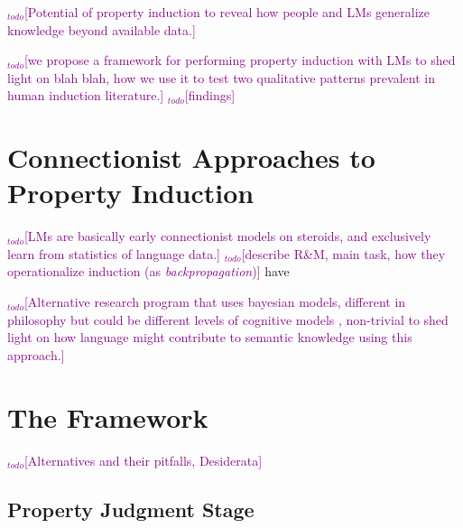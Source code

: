\documentclass[10pt,letterpaper]{article}
\newcommand{\todo}[1]{\textcolor{purple}{$_{todo}$[#1]}}
\begin{document}
\todo{Potential of property induction to reveal how people and LMs generalize knowledge beyond available data.}

\todo{we propose a framework for performing property induction with LMs to shed light on blah blah, how we use it to test two qualitative patterns prevalent in human induction literature.}
\todo{findings}



\section{Connectionist Approaches to Property Induction}
\todo{LMs are basically early connectionist models on steroids, and exclusively learn from statistics of language data.}
\todo{describe R\&M, main task, how they operationalize induction (as \textit{backpropagation})} have 

\todo{Alternative research program that uses bayesian models, different in philosophy but could be different levels of cognitive models \citep{}, non-trivial to shed light on how language might contribute to semantic knowledge using this approach.}

\section{The Framework}
\todo{Alternatives and their pitfalls, Desiderata}
\subsection{Property Judgment Stage}
\end{document}
